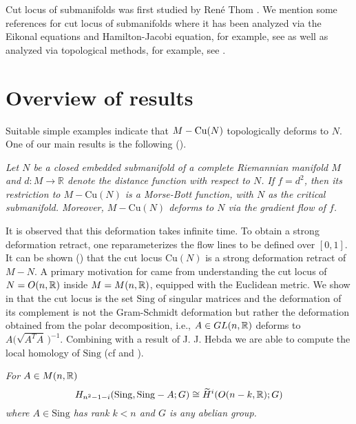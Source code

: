 \vspace{0.2cm}
\hf Cut locus of submanifolds was first studied by Ren\'{e} Thom \cite{Thom72}. We mention some references for cut locus of submanifolds where it has been analyzed via the Eikonal equations and Hamilton-Jacobi equation, for example, see \cite{AnGu11,MaMe03} as well as analyzed via topological methods, for example, see \cite{Fla65,Ozo74,Singh87A,Singh87B,Singh88}.

\section{Overview of results}
\hfb Suitable simple examples indicate that $M-\mathrm{Cu}(N)$ topologically deforms to $N$. One of our main results is the following ().
\begin{mainthm}\label{thm:ThmA}
    \textit{Let $N$ be a closed embedded submanifold of a complete Riemannian manifold $M$ and $d:M\to \mathbb{R}$ denote the distance function with respect to $N$. If $f=d^2$, then its restriction to $M-\mathrm{Cu}(N)$ is a Morse-Bott function, with $N$ as the critical submanifold. Moreover, $M-\mathrm{Cu}(N)$ deforms to $N$ via the gradient flow of $f$.}
\end{mainthm}

\vspace{0.2cm}
\noindent It is observed that this deformation takes infinite time. To obtain a strong deformation retract, one reparameterizes the flow lines to be defined over $[0,1]$. It can be shown () that the cut locus $\mathrm{Cu}(N)$ is a strong deformation retract of $M-N$. A primary motivation for  came from understanding the cut locus of $N=O(n,\mathbb{R})$ inside $M= M(n,\mathbb{R})$, equipped with the Euclidean metric. We show in  that the cut locus is the set $\mathrm{Sing}$ of singular matrices and the deformation of its complement is not the Gram-Schmidt deformation but rather the deformation obtained from the polar decomposition, i.e., $A\in GL(n,\mathbb{R})$ deforms to $A\big(\sqrt{A^T A}\,\big)^{-1}$. Combining with a result of J. J. Hebda \cite[Theorem 1.4]{Heb83} we are able to compute the local homology of $\mathrm{Sing}$ (cf  and ).
\begin{mainthm}\label{thm:ThmB}
    \textit{For $A\in M(n,\mathbb{R})$
    \begin{displaymath}
        H_{n^2-1-i}(\mathrm{Sing},\mathrm{Sing} -A;G)\cong \widetilde{H}^i(O(n-k,\mathbb{R});G)
    \end{displaymath}
    where $A\in \mathrm{Sing}$ has rank $k<n$ and $G$ is any abelian group. }
\end{mainthm}

